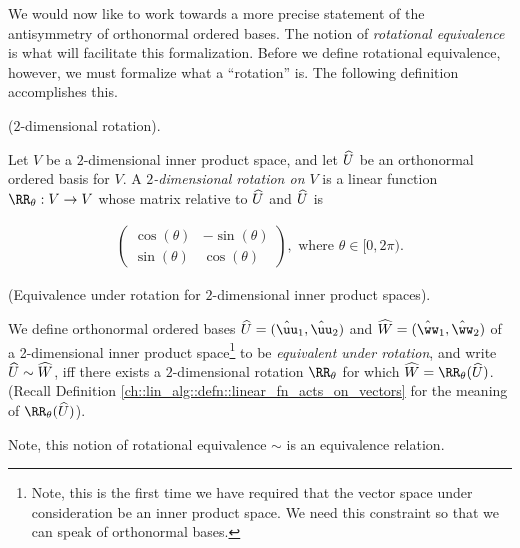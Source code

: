 We would now like to work towards a more precise statement of the antisymmetry of orthonormal ordered bases. The notion of \textit{rotational equivalence} is what will facilitate this formalization. Before we define rotational equivalence, however, we must formalize what a ``rotation'' is. The following definition accomplishes this.

\begin{defn}
\label{ch::lin_alg::defn::2-rotation}
    ($2$-dimensional rotation).
    
    Let $V$ be a $2$-dimensional inner product space, and let $\widehat{U}$ be an orthonormal ordered basis for $V$.
    A \textit{$2$-dimensional rotation on $V$} is a linear function $\RR_\theta:V \rightarrow V$ whose matrix relative to $\widehat{U}$ and $\widehat{U}$ is
    
    \begin{align*}
        \begin{pmatrix}
            \cos(\theta) & -\sin(\theta) \\
            \sin(\theta) & \cos(\theta)
        \end{pmatrix},
        \text{ where $\theta \in [0, 2\pi)$}.
    \end{align*}
\end{defn}

\begin{defn}
    (Equivalence under rotation for $2$-dimensional inner product spaces).

    We define orthonormal ordered bases $\hU = (\huu_1, \huu_2)$ and $\hW = (\hww_1, \hww_2)$ of a 2-dimensional inner product space\footnote{Note, this is the first time we have required that the vector space under consideration be an inner product space. We need this constraint so that we can speak of orthonormal bases.} to be \textit{equivalent under rotation}, and write $\widehat{U} \sim \widehat{W}$, iff there exists a $2$-dimensional rotation $\RR_\theta$ for which $\hW = \RR_\theta(\hU)$. (Recall Definition \ref{ch::lin_alg::defn::linear_fn_acts_on_vectors} for the meaning of $\RR_\theta(\hU)$).

    Note, this notion of rotational equivalence $\sim$ is an equivalence relation.
\end{defn}

